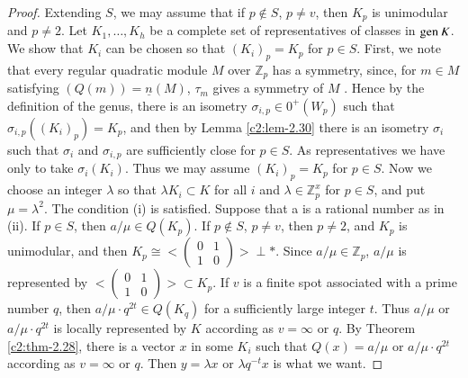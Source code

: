 \begin{proof}
Extending $S$, we may assume that if $p\not\in S$, $p\neq v$, then
$K_p$ is unimodular and $p\neq 2$. Let $K_1, \ldots, K_h$ be a
complete set of representatives of classes in $\operatorname{gen} K$. We show that
$K_i$ can be chosen so that $(K_i)_p =K_p$ for $p\in
S$. First, we note that every regular quadratic module $M$ over
$\mathbb{Z}_p$ has a symmetry, since, for $m\in M$ satisfying
$(Q(m))=\underline{n}(M)$, $\tau_m$ gives a symmetry of $M$ . Hence by
the definition of the genus, there is an isometry
$\sigma_{i,p}\in 0^+(W_p)$ such that
$\sigma_{i,p}((K_i)_p)=K_p$, and then by Lemma \ref{c2:lem-2.30} there is an
isometry $\sigma_i$ such that $\sigma_i$ and $\sigma_{i,p}$ are
sufficiently close for $p\in S$. As representatives we have
only to take $\sigma_i(K_i)$. Thus we may assume $(K_i)_p=K_p$ for
$p\in S$. Now we choose an integer $\lambda$ so that $\lambda
K_i \subset K$ for all $i$ and $\lambda \in \mathbb{Z}^x_p$
for $p \in S$, and put $\mu = \lambda^2$. The condition (i)
is satisfied. Suppose that a is a rational number as in (ii). If
$p\in S$, then $a/\mu\in Q(K_p)$. If $p\not\in S$,
$p\neq v$, then $p\neq 2$, and $K_p$ is unimodular, and then
$K_p \cong<\left(\begin{smallmatrix}
0 &1\\1&0
\end{smallmatrix}\right)>\perp\ast$. Since
$a/\mu\in \mathbb{Z}_p$, $a/\mu$ is represented by
$<\left(\begin{smallmatrix}
0&1\\1&0
\end{smallmatrix}\right)> \subset K_p$. If $v$ is a finite spot
associated with a prime number $q$, then $a/\mu \cdot q^{2t} \in
Q(K_q)$ for a sufficiently large integer $t$. Thus $a/\mu$ or
$a/\mu\cdot q^{2t}$ is locally represented by $K$ according as
$v=\infty$ or $q$. By Theorem \ref{c2:thm-2.28}, there is a vector $x$ in some
$K_i$ such that $Q(x)=a/\mu$ or $a/\mu \cdot q^{2t}$ according as
$v=\infty$ or $q$. Then $y=\lambda x$ or $\lambda q^{-t}x$ is what we
want. 
\end{proof}

